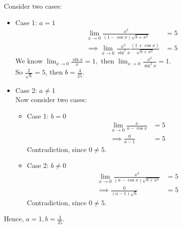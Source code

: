 \documentclass[11pt]{article}
\begin{document}
\begin{enumerate}[(a)]
    Consider two cases: 
    \begin{itemize}
        \item Case 1: $a=1$ 
        \begin{align*}
            \lim_{x\to 0}\frac{x^2}{(1-\cos x)\sqrt{b+x^2}}&=5\\
            \implies \lim_{x\to 0} \frac{x^2}{\sin^2 x}\frac{(1+\cos x)}{\sqrt{b+x^2}}&= 5
        \end{align*}
        We know $\displaystyle \lim_{x\to 0}\frac{\sin x}{x}=1,$ then $\displaystyle \lim_{x\to 0}\frac{x^2}{\sin^2 x}=1.$\\
        So $\frac{2}{\sqrt{b}}= 5$, then $b= \frac{4}{25}$.
        \item Case 2: $a\neq 1$\\
        Now consider two cases: 
        \begin{itemize}
            \item Case 1: $b=0$
            \begin{align*}
                \lim_{x\to 0}\frac{x}{a-\cos x}&=5 \\ 
                \implies \frac{0}{a-1}&=5
            \end{align*}
            Contradiction, since $0\neq 5.$
            \item Case 2: $b\neq 0$
            \begin{align*}
                \lim_{x\to 0}\frac{x^2}{(a-\cos x)\sqrt{b+x^2}}&= 5 \\
                \implies \frac{0}{(a-1)\sqrt{b}}&=5
            \end{align*}
            Contradiction, since $0\neq 5.$
        \end{itemize}
    \end{itemize}
    Hence, $a=1, b = \frac{4}{25}.$
\end{enumerate}
\newpage 
\end{document}

